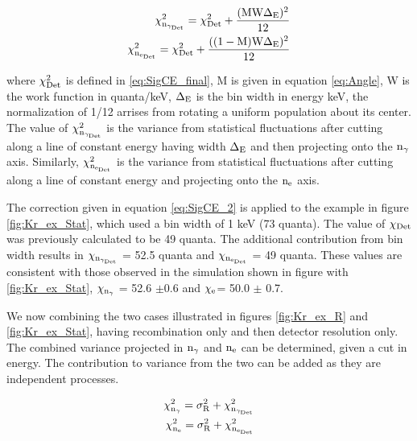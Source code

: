 \begin{equation}
\begin{split}
\rm \chi_{n_{\gamma_{Det}}}^2= \chi_{Det}^2 + \frac{(MW\Delta_E)^2}{12}\\
\rm \chi_{n_{e_{Det}}}^2= \chi_{Det}^2 + \frac{((1-M)W\Delta_E)^2}{12}\\
\label{eq:SigCE_2}
\end{split}
\end{equation}

\noindent where $\rm \chi_{Det}^2$ is defined in \ref{eq:SigCE_final}, M is given in equation \ref{eq:Angle}, W is the work function in quanta/keV, $\rm \Delta_E$ is the bin width in energy keV, the normalization of 1/12 arrises from rotating a uniform population about its center. The value of $\rm \chi_{n_{\gamma_{Det}}}^2$ is the variance from statistical fluctuations after cutting along a line of constant energy having width $\rm \Delta_E$ and then projecting onto the $\rm n_\gamma$ axis. Similarly, $\rm \chi_{n_{e_{Det}}}^2$ is the variance from statistical fluctuations after cutting along a line of constant energy and projecting onto the $\rm n_e$ axis. 

The correction given in equation \ref{eq:SigCE_2} is applied to the example in figure \ref{fig:Kr_ex_Stat}, which used a bin width of 1 keV  (73 quanta). The value of $\rm \chi_{Det}$ was previously calculated to be 49 quanta. The additional contribution from bin width results in $\rm \chi_{n_{\gamma_{Det}}}$ = 52.5 quanta and $\rm \chi_{n_{e_{Det}}}$ = 49 quanta. These values are consistent with those observed in the simulation shown in figure with \ref{fig:Kr_ex_Stat}, $\rm \chi_{n_\gamma}$ = 52.6 $\pm$0.6 and $\rm \chi_e$= 50.0 $\pm$ 0.7. 


We now combining the two cases illustrated in figures \ref{fig:Kr_ex_R} and \ref{fig:Kr_ex_Stat}, having recombination only and then detector resolution only. The combined variance projected in $\rm n_\gamma$ and $\rm n_e$ can be determined, given a cut in energy. The contribution to variance from the two can be added as they are independent processes.

\begin{alignat}{2}
\label{eq:Chi_total_g} \rm \chi_{n_{\gamma}}^2 = \sigma_{R}^2 + \chi_{n_{\gamma_{Det}}}^2 \\
\label{eq:Chi_total_e} \rm \chi_{n_{e}}^2 = \sigma_{R}^2 + \chi_{n_{e_{Det}}}^2 \\
\end{alignat}

